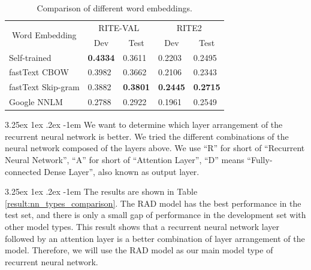 \documentclass[12pt]{article}
\makeatletter
\renewcommand\paragraph{\@startsection{paragraph}{5}{\z@}%
  {3.25ex \@plus1ex \@minus.2ex}%
  {-1em}%
  {\normalfont\normalsize\bfseries}}
\makeatother
\begin{document}
\begin{CJK*}{UTF8}{bkai}
\begin{spacing}{1.77}
\begin{table}[H]
  \centering
  \setlength{\extrarowheight}{-3pt}
  \begin{tabular}{|l|l|l|l|l|}
  \hline
  \multicolumn{1}{|c|}{\multirow{2}{*}{Word   Embedding}} & \multicolumn{2}{c|}{RITE-VAL} & \multicolumn{2}{c|}{RITE2} \\ \cline{2-5}
  \multicolumn{1}{|c|}{} & \multicolumn{1}{c|}{Dev} & \multicolumn{1}{c|}{Test} & \multicolumn{1}{c|}{Dev} & \multicolumn{1}{c|}{Test} \\ \hline
  Self-trained & \textbf{0.4334} & 0.3611 & 0.2203 & 0.2495 \\ \hline
  fastText CBOW & 0.3982 & 0.3662 & 0.2106 & 0.2343 \\ \hline
  fastText Skip-gram & 0.3882 & \textbf{0.3801} & \textbf{0.2445} & \textbf{0.2715} \\ \hline
  Google NNLM & 0.2788 & 0.2922 & 0.1961 & 0.2549 \\ \hline
  \end{tabular}
  \caption{Comparison of different word embeddings.}
  \label{result:nnlm_comparison}
\end{table}

\paragraph{}
We want to determine which layer arrangement of the recurrent neural network is better. We tried the different combinations of the neural network composed of the layers above. We use ``R'' for short of ``Recurrent Neural Network'', ``A'' for short of ``Attention Layer'', ``D'' means ``Fully-connected Dense Layer'', also known as output layer.

\paragraph{}
The results are shown in Table \ref{result:nn_types_comparison}. The RAD model has the best performance in the test set, and there is only a small gap of performance in the development set with other model types. This result shows that a recurrent neural network layer followed by an attention layer is a better combination of layer arrangement of the model. Therefore, we will use the RAD model as our main model type of recurrent neural network.


\end{spacing}
\end{CJK*}
\end{document}
